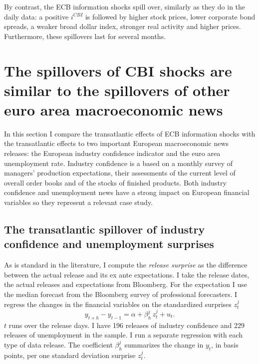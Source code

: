 \documentclass[a4paper,12pt]{article}
\begin{document}
By contrast, the ECB information shocks spill over, similarly as they do in the daily data:
a positive $i^{CBI}$ is followed by higher stock prices, lower corporate bond spreads, a weaker broad dollar index, stronger real activity and higher prices.
Furthermore, these spillovers last for several months.

\section{The spillovers of CBI shocks are similar to the spillovers of other euro area macroeconomic news}

In this section I compare the transatlantic effects of ECB information shocks with the
transatlantic effects to two important European macroeconomic news releases: 
the European industry confidence indicator and the euro area unemployment rate.
Industry confidence is a based on a monthly survey of managers’
production expectations, their assessments of the current level of overall order books and of the
stocks of finished products.
Both industry confidence and unemployment news have a strong impact on European financial variables
so they represent a relevant case study.

\subsection{The transatlantic spillover of industry confidence and unemployment surprises}

As is standard in the literature, I compute the \emph{release surprise} as the difference between the actual release
and its ex ante expectations. 
I take the release dates, the actual releases and expectations from Bloomberg.
For the expectation I use the median forecast from the Bloomberg survey of professional forecasters.
I regress the changes in the financial variables on the standardized surprises $z_t^j$
\begin{equation}
y^{}_{t+h}-y^{}_{t-1} = \alpha + \beta_h^j\, z_t^j + u_t.
\end{equation}
$t$ runs over the release days. I have 196 releases of industry confidence and 229 releases of unemployment in the sample. I run a separate regression with each type of data release.
The coefficient $\beta_h^j$ summarizes the change in $y_t$, in basis points, per one
standard deviation surprise $z_t^j$.
\end{document}

